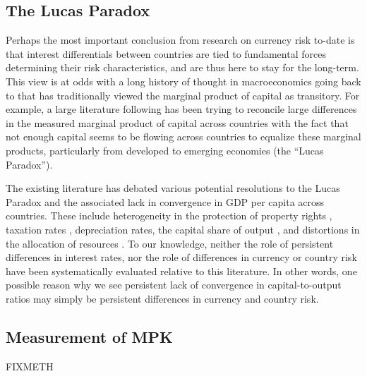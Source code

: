\documentclass{ar-1col}
\begin{document}
\subsection{The Lucas Paradox}

Perhaps the most important conclusion from research on currency risk to-date is that interest differentials between countries are tied to fundamental forces determining their risk characteristics, and are thus here to stay for the long-term. This view is at odds with a long history of thought in macroeconomics going back to \cite{solow1956contribution} that has traditionally viewed the marginal product of capital as transitory. For example, a large literature following \citet{Lucas1990} has been trying to reconcile large differences in the measured marginal product of capital across countries with the fact that not enough capital seems to be flowing across countries to equalize these marginal products, particularly from developed to emerging economies (the ``Lucas Paradox''). 

The existing literature has debated various potential resolutions to the Lucas Paradox and the associated lack in convergence in GDP per capita across countries. These include heterogeneity in the protection of property rights \citep{HallJones1997}, taxation rates \citep{Jorgenson1996}, depreciation rates, the capital share of output \citep{Neiman2014}, and distortions in the allocation of resources \citep{HsiehKlenow2009}.  To our knowledge, neither the role of persistent differences in interest rates, nor the role of differences in currency or country risk have been systematically evaluated relative to this literature. In other words, one possible reason why we see persistent lack of convergence in capital-to-output ratios may simply be persistent differences in currency and country risk.


\subsection{Measurement of MPK}

FIXMETH
\end{document}

